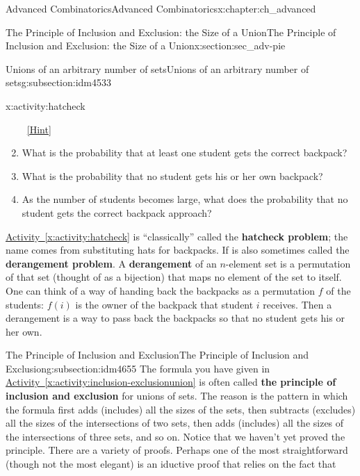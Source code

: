 \documentclass[oneside,10pt,]{book}
\newcommand{\terminology}[1]{\textbf{#1}}
\numberwithin{equation}{chapter}
\begin{document}
\begin{chapterptx}{Advanced Combinatorics}{}{Advanced Combinatorics}{}{}{x:chapter:ch_advanced}
\begin{sectionptx}{The Principle of Inclusion and Exclusion: the Size of a Union}{}{The Principle of Inclusion and Exclusion: the Size of a Union}{}{}{x:section:sec_adv-pie}
\begin{subsectionptx}{Unions of an arbitrary number of sets}{}{Unions of an arbitrary number of sets}{}{}{g:subsection:idm4533}
\begin{activity}{}{x:activity:hatcheck}
\begin{enumerate}[font=\bfseries,label=(\alph*),ref=\alph*]
\qquad~\hfill{\tiny\hyperlink{g:hint:idm4585-back}{[Hint]}}\item{}What is the probability that at least one student gets the correct backpack?%
\item\label{x:task:hatcheckprobpart}What is the probability that no student gets his or her own backpack?%
\item{}As the number of students becomes large, what does the probability that no student gets the correct backpack approach?%
\end{enumerate}
\end{activity}
\hyperref[x:activity:hatcheck]{Activity~\ref{x:activity:hatcheck}} is ``classically'' called the \terminology{hatcheck problem}; the name comes from substituting hats for backpacks. If is also sometimes called the \terminology{derangement problem}. A \terminology{derangement} of an \(n\)-element set is a permutation of that set (thought of as a bijection) that maps no element of the set to itself. One can think of a way of handing back the backpacks as a permutation \(f\) of the students: \(f(i)\) is the owner of the backpack that student \(i\) receives. Then a derangement is a way to pass back the backpacks so that no student gets his or her own.%
\end{subsectionptx}
%
%
\typeout{************************************************}
\typeout{************************************************}
%
\begin{subsectionptx}{The Principle of Inclusion and Exclusion}{}{The Principle of Inclusion and Exclusion}{}{}{g:subsection:idm4655}
The formula you have given in \hyperref[x:activity:inclusion-exclusionunion]{Activity~\ref{x:activity:inclusion-exclusionunion}} is often called \terminology{the principle of inclusion and exclusion} for unions of sets. The reason is the pattern in which the formula first adds (includes) all the sizes of the sets, then subtracts (excludes) all the sizes of the intersections of two sets, then adds (includes) all the sizes of the intersections of three sets, and so on.   Notice that we haven't yet proved the principle. There are a variety of proofs.  Perhaps one of the most straightforward (though not the most elegant) is an iductive proof that relies on the fact that%
\begin{equation*}

\end{equation*}
\end{subsectionptx}
\end{sectionptx}
\end{chapterptx}
\end{document}
